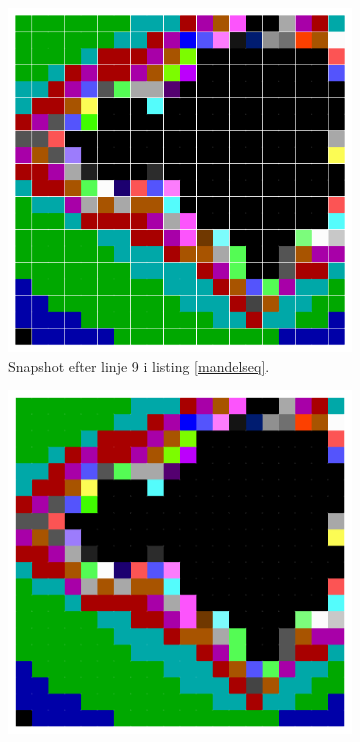 \begin{figure}
    \begin{subfigure}[b]{0.3\textwidth}
        \centering
        \includegraphics[width=\textwidth]{pictures/M4.png}
        \caption{ Snapshot efter linje 9 i listing \ref{mandelseq}. }
    \end{subfigure}
    \begin{subfigure}[b]{0.3\textwidth}
        \centering
        \includegraphics[width=\textwidth]{pictures/M5.png}

\end{subfigure}
\end{figure}
